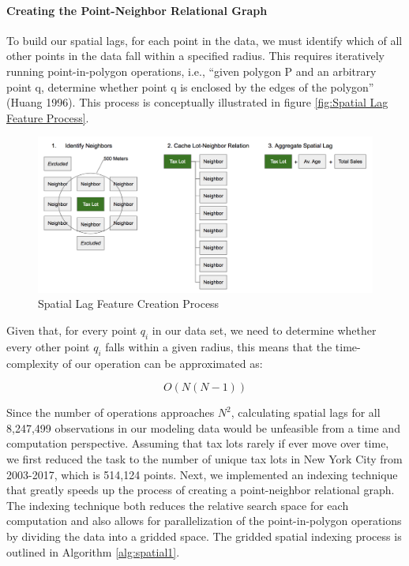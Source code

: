 \documentclass[12pt,]{article}
\let\oldparagraph\paragraph
\renewcommand{\paragraph}[1]{\oldparagraph{#1}\mbox{}}
\begin{document}
\hypertarget{creating-the-point-neighbor-relational-graph}{%
\paragraph{Creating the Point-Neighbor Relational
Graph}\label{creating-the-point-neighbor-relational-graph}}

To build our spatial lags, for each point in the data, we must identify
which of all other points in the data fall within a specified radius.
This requires iteratively running point-in-polygon operations, i.e.,
``given polygon P and an arbitrary point q, determine whether point q is
enclosed by the edges of the polygon'' (Huang 1996). This process is
conceptually illustrated in figure
\ref{fig:Spatial Lag Feature Process}.

\begin{figure}[H]
\includegraphics[width=1\linewidth]{Sections/tables and figures/Spatial Lag Creation} \caption{Spatial Lag Feature Creation Process}\label{fig:Spatial Lag Feataure Process}
\end{figure}

Given that, for every point \(q_i\) in our data set, we need to
determine whether every other point \(q_i\) falls within a given radius,
this means that the time-complexity of our operation can be approximated
as:

\[
O(N(N-1))
\]

Since the number of operations approaches \(N^2\), calculating spatial
lags for all 8,247,499 observations in our modeling data would be
unfeasible from a time and computation perspective. Assuming that tax
lots rarely if ever move over time, we first reduced the task to the
number of unique tax lots in New York City from 2003-2017, which is
514,124 points. Next, we implemented an indexing technique that greatly
speeds up the process of creating a point-neighbor relational graph. The
indexing technique both reduces the relative search space for each
computation and also allows for parallelization of the point-in-polygon
operations by dividing the data into a gridded space. The gridded
spatial indexing process is outlined in Algorithm \ref{alg:spatial1}.
\end{document}
